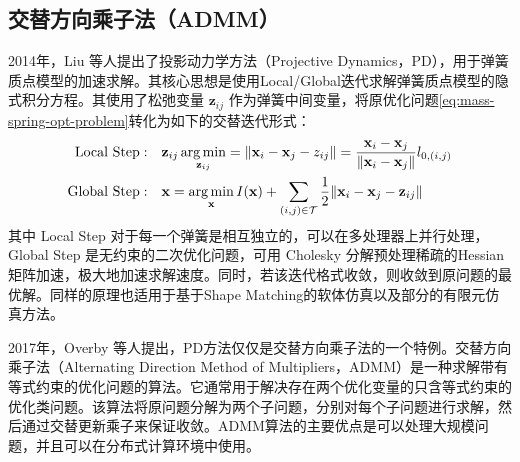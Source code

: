 \subsection{交替方向乘子法（ADMM）}\label{sec:admm}

2014年，Liu 等人提出了投影动力学方法（Projective Dynamics，PD），用于弹簧质点模型的加速求解。其核心思想是使用Local/Global迭代求解弹簧质点模型的隐式积分方程。其使用了松弛变量 $\mathbf z_{ij}$ 作为弹簧中间变量，将原优化问题\ref{eq:mass-spring-opt-problem}转化为如下的交替迭代形式：
\begin{equation}\label{eq:mass-spring-pd}
  \begin{aligned}
    \text{Local Step}: & \quad\mathbf z_{ij} \mathop{\arg\min}\limits_{\mathbf z_{ij}} = \|\mathbf x_i-\mathbf x_j - z_{ij}\| = \frac{\mathbf x_i-\mathbf x_j}{\|\mathbf x_i-\mathbf x_j\|} l_{0, (i, j)}\\
    \text{Global Step}: & \quad \mathbf x = \mathop{\arg\min}\limits_{\mathbf x} I(\mathbf x) +\sum_{(i, j) \in \mathcal T} \frac{1}{2} \| \mathbf x_i-\mathbf x_j -\mathbf z_{ij}\|
  \end{aligned}
\end{equation}
其中 Local Step 对于每一个弹簧是相互独立的，可以在多处理器上并行处理，Global Step 是无约束的二次优化问题，可用 Cholesky 分解预处理稀疏的Hessian矩阵加速，极大地加速求解速度。同时，若该迭代格式收敛，则收敛到原问题的最优解。同样的原理也适用于基于Shape Matching的软体仿真以及部分的有限元仿真方法。

2017年，Overby 等人提出，PD方法仅仅是交替方向乘子法的一个特例。交替方向乘子法（Alternating Direction Method of Multipliers，ADMM）是一种求解带有等式约束的优化问题的算法。它通常用于解决存在两个优化变量的只含等式约束的优化类问题。该算法将原问题分解为两个子问题，分别对每个子问题进行求解，然后通过交替更新乘子来保证收敛。ADMM算法的主要优点是可以处理大规模问题，并且可以在分布式计算环境中使用。

